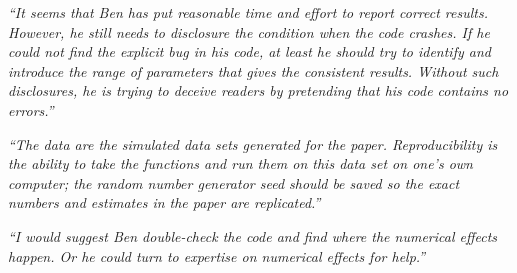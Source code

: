 \documentclass[portrait,11pt]{seminar}
\begin{document}
{\it  ``It seems that Ben has put reasonable time and effort to report correct results. However, he still needs to disclosure the condition when the code crashes. If he could not find the explicit bug in his code, at least he should try to identify and introduce the range of parameters that gives the consistent results. Without such disclosures, he is trying to deceive readers by pretending that his code contains no errors.''}







\es


{\it ``The data are the simulated data sets generated for the paper. Reproducibility is the ability to take the functions and run them on this data set on one’s own computer; the random number generator seed should be saved so the exact numbers and estimates in the paper are replicated.''}




\es  {}

{\it ``I would suggest Ben double-check the code and find where the numerical effects happen. Or he could turn to expertise on numerical effects for help.''}

\end{document}
